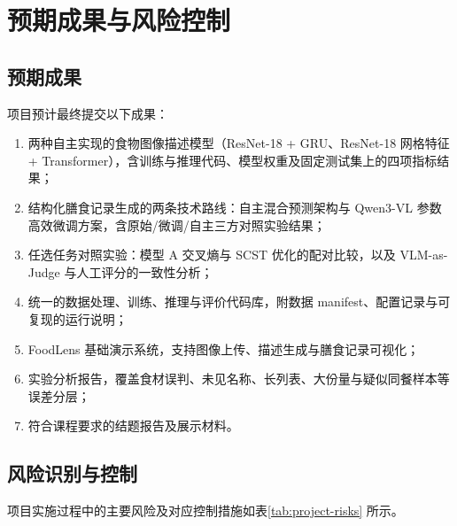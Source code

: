 \section{预期成果与风险控制}
\label{sec:outcomes-risks}
\subsection{预期成果}
项目预计最终提交以下成果：

\begin{enumerate}
\item 两种自主实现的食物图像描述模型（ResNet-18 + GRU、ResNet-18 网格特征 + Transformer），含训练与推理代码、模型权重及固定测试集上的四项指标结果；
\item 结构化膳食记录生成的两条技术路线：自主混合预测架构与 Qwen3-VL 参数高效微调方案，含原始/微调/自主三方对照实验结果；
\item 任选任务对照实验：模型 A 交叉熵与 SCST 优化的配对比较，以及 VLM-as-Judge 与人工评分的一致性分析；
\item 统一的数据处理、训练、推理与评价代码库，附数据 manifest、配置记录与可复现的运行说明；
\item FoodLens 基础演示系统，支持图像上传、描述生成与膳食记录可视化；
\item 实验分析报告，覆盖食材误判、未见名称、长列表、大份量与疑似同餐样本等误差分层；
\item 符合课程要求的结题报告及展示材料。
\end{enumerate}

\subsection{风险识别与控制}
项目实施过程中的主要风险及对应控制措施如表\ref{tab:project-risks} 所示。


